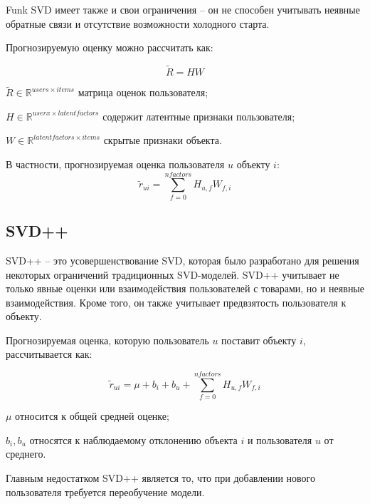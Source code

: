 Funk SVD имеет также и свои ограничения -- он не способен учитывать неявные обратные связи и отсутствие возможности холодного старта.

Прогнозируемую оценку можно рассчитать как:

\begin{equation}
	\widetilde{R} = HW
\end{equation}
\begin{eqexpl}[35mm]
\item{$\widetilde{R} \in \mathbb{R}^{users \times items}$} матрица оценок пользователя;
\item{$H \in \mathbb{R}^{userx \times latent factors}$} содержит латентные признаки пользователя;
\item{$W \in \mathbb{R}^{latent factors \times items}$} скрытые признаки объекта.
\end{eqexpl}

В частности, прогнозируемая оценка пользователя $u$ объекту $i$:
\begin{equation}
	\widetilde{r}_{ui} = \sum^{n factors}_{f = 0} H_{u, f} W_{f, i}
\end{equation}

\subsection{SVD++}

SVD++ -- это усовершенствование SVD, которая было разработано для решения некоторых ограничений традиционных SVD-моделей. SVD++ учитывает не только явные оценки или взаимодействия пользователей с товарами, но и неявные взаимодействия. Кроме того, он также учитывает предвзятость пользователя к объекту.

Прогнозируемая оценка, которую пользователь $u$ поставит объекту $i$, рассчитывается как:

\begin{equation}
	\widetilde{r}_{ui} = \mu + b_i + b_u + \sum^{n factors}_{f = 0}{H_{u, f} W_{f, i}}
\end{equation}
\begin{eqexpl}[15mm]
\item{$\mu$} относится к общей средней оценке;
\item{$b_i, b_u$} относятся к наблюдаемому отклонению объекта $i$ и пользователя $u$ от среднего.
\end{eqexpl}

Главным недостатком SVD++ является то, что при добавлении нового пользователя требуется переобучение модели.

\pagebreak